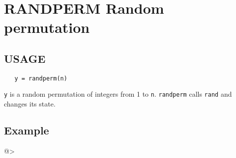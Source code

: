 \section{RANDPERM Random permutation}

\subsection{USAGE}

\begin{verbatim}
   y = randperm(n)
\end{verbatim}
\verb|y| is a random permutation of integers from 1 to \verb|n|.
\verb|randperm| calls \verb|rand| and changes its state.
\subsection{Example}

@>
